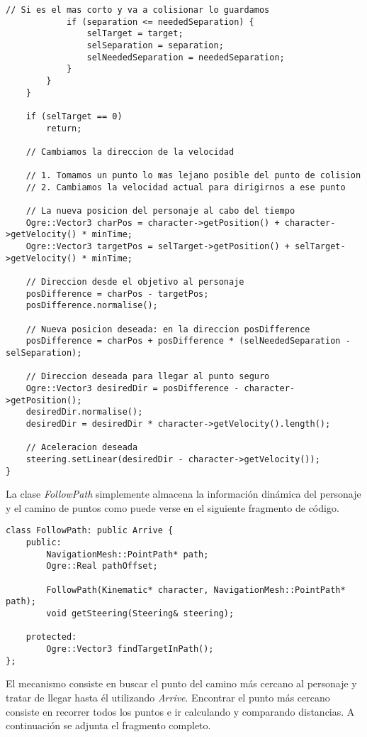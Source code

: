 \begin{lstlisting}[style=C++]
            // Si es el mas corto y va a colisionar lo guardamos
            if (separation <= neededSeparation) {
                selTarget = target;
                selSeparation = separation;
                selNeededSeparation = neededSeparation;
            }
        }
    }

    if (selTarget == 0)
        return;
        
    // Cambiamos la direccion de la velocidad
    
    // 1. Tomamos un punto lo mas lejano posible del punto de colision
    // 2. Cambiamos la velocidad actual para dirigirnos a ese punto
    
    // La nueva posicion del personaje al cabo del tiempo
    Ogre::Vector3 charPos = character->getPosition() + character->getVelocity() * minTime;
    Ogre::Vector3 targetPos = selTarget->getPosition() + selTarget->getVelocity() * minTime;
    
    // Direccion desde el objetivo al personaje
    posDifference = charPos - targetPos;
    posDifference.normalise();
    
    // Nueva posicion deseada: en la direccion posDifference
    posDifference = charPos + posDifference * (selNeededSeparation - selSeparation);
    
    // Direccion deseada para llegar al punto seguro
    Ogre::Vector3 desiredDir = posDifference - character->getPosition();
    desiredDir.normalise();
    desiredDir = desiredDir * character->getVelocity().length();
    
    // Aceleracion deseada
    steering.setLinear(desiredDir - character->getVelocity());
}
\end{lstlisting}

La clase \textit{FollowPath} simplemente almacena la información
dinámica del personaje y el camino de puntos como puede verse en el siguiente
fragmento de código.

\begin{lstlisting}[style=C++]
class FollowPath: public Arrive {
    public:
        NavigationMesh::PointPath* path;
        Ogre::Real pathOffset;
        
        FollowPath(Kinematic* character, NavigationMesh::PointPath* path);
        void getSteering(Steering& steering);
        
    protected:
        Ogre::Vector3 findTargetInPath();
};
\end{lstlisting}

El mecanismo consiste en buscar el punto del camino más cercano al personaje 
y tratar de llegar hasta él utilizando \textit{Arrive}. Encontrar el punto
más cercano consiste en recorrer todos los puntos e ir calculando y comparando
distancias. A continuación se adjunta el fragmento completo.\\ 

